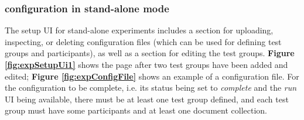 \documentclass[fleqn]{article}
\begin{document}
\subsubsection{configuration in stand-alone mode}

The setup UI for stand-alone experiments includes a section for uploading, inspecting, or deleting configuration files (which can be used for
defining test groups and participants), as well as a section for editing the test groups. \textbf{Figure \ref{fig:expSetupUi1}}
shows the page after two test groups have been added and edited; \textbf{Figure \ref{fig:expConfigFile}} shows an example of a configuration file. 
For the configuration to be complete, i.e. its status being set to 
\emph{complete} and the \emph{run} UI being available, there must be at least one test group defined, and each test group must 
have some participants and at least one document collection.
\end{document}
